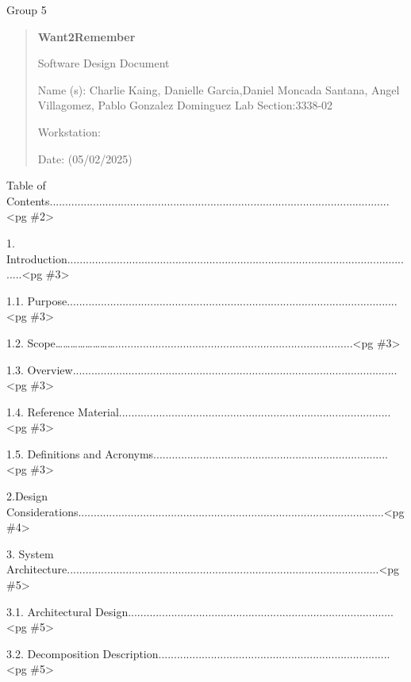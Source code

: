 \documentclass[
]{article}
\author{}
\date{}
\begin{document}
Group 5

\begin{quote}
\textbf{Want2Remember}

Software Design Document

Name (s): Charlie Kaing, Danielle Garcia,Daniel Moncada Santana, Angel
Villagomez, Pablo Gonzalez Dominguez Lab Section:3338-02

Workstation:

Date: (05/02/2025)
\end{quote}

Table of
Contents..............................................................................................................\textless pg
\#2\textgreater{}

1.
Introduction..................................................................................................................\textless pg
\#3\textgreater{}

1.1.
Purpose...........................................................................................................\textless pg
\#3\textgreater{}

1.2.
Scope\ldots\ldots\ldots\ldots\ldots\ldots\ldots\ldots.............................................................................\textless pg
\#3\textgreater{}

1.3.
Overview.........................................................................................................\textless pg
\#3\textgreater{}

1.4. Reference
Material........................................................................................\textless pg
\#3\textgreater{}

1.5. Definitions and
Acronyms............................................................................\textless pg
\#3\textgreater{}

2.Design
Considerations...................................................................................................\textless pg
\#4\textgreater{}

3. System
Architecture.....................................................................................................\textless pg
\#5\textgreater{}

3.1. Architectural
Design......................................................................................\textless pg
\#5\textgreater{}

3.2. Decomposition
Description...........................................................................\textless pg
\#5\textgreater{}
\end{document}
